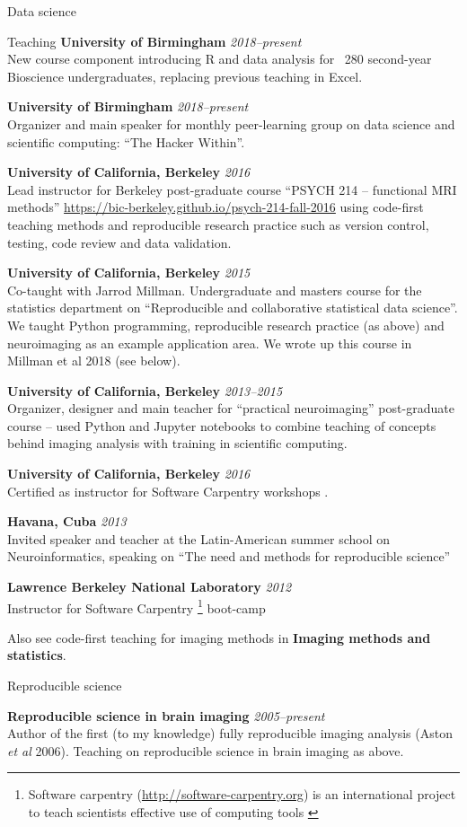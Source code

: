 \documentclass{cv}
\newcommand{\PlaceDateNote}[3]{{\bf #1} \hfill {\em #2} \\#3}
\newcommand{\UoB}{University of Birmingham}
\newcommand{\UCB}{University of California, Berkeley}
\begin{document}
\begin{cvSection}{Data science}
\begin{cvSubSection}{Teaching}
\PlaceDateNote{\UoB}{2018--present} {New course component introducing R and
    data analysis for ~280 second-year Bioscience undergraduates, replacing
    previous teaching in Excel.}

\PlaceDateNote{\UoB}{2018--present}
    {Organizer and main speaker for monthly peer-learning group on data science
    and scientific computing: ``The Hacker Within''.}

\PlaceDateNote{\UCB}{2016}
{Lead instructor for Berkeley post-graduate course ``PSYCH 214 -- functional
    MRI methods'' \url{https://bic-berkeley.github.io/psych-214-fall-2016}
    using code-first teaching methods and reproducible research practice such
    as version control, testing, code review and data validation.}

\PlaceDateNote{\UCB}{2015}
{Co-taught with Jarrod Millman.  Undergraduate and masters course for the
    statistics department on ``Reproducible and collaborative statistical data
    science''.  We taught Python programming, reproducible research practice
    (as above) and neuroimaging as an example application area.  We wrote up
    this course in Millman et al 2018 (see below).}

\PlaceDateNote{\UCB}{2013--2015} {Organizer, designer and main teacher for
    ``practical neuroimaging'' post-graduate course -- used Python and Jupyter
    notebooks to combine teaching of concepts behind imaging analysis with
    training in scientific computing.}

\PlaceDateNote{\UCB}{2016} {Certified as instructor for Software Carpentry
    workshops \footref{swc}.}

\PlaceDateNote{Havana, Cuba}{2013} {Invited speaker and teacher at the
    Latin-American summer school on Neuroinformatics, speaking on ``The need
    and methods for reproducible science''}

\PlaceDateNote{Lawrence Berkeley National Laboratory}{2012} {Instructor for
    Software Carpentry \footnote{ Software carpentry
    (\url{http://software-carpentry.org}) is an international project to teach
    scientists effective use of computing tools \label{swc}} boot-camp}

Also see code-first teaching for imaging methods in {\bf Imaging methods and
    statistics}.

\end{cvSubSection}

\begin{cvSubSection}{Reproducible science}

\PlaceDateNote{Reproducible science in brain imaging}{2005--present}
{Author of the first (to my knowledge) fully reproducible imaging analysis
    (Aston {\em et al} 2006).  Teaching on reproducible science in brain
    imaging as above.

}
\end{cvSubSection}
\end{cvSection}
\end{document}
